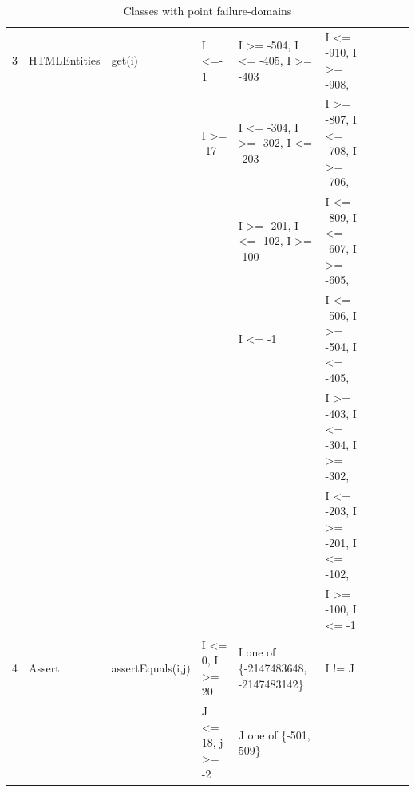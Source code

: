 \documentclass[runningheads,a4paper]{llncs}
\begin{document}
\begin{table}[h]
{{\begin{tabular}{|l|l|l|l|l|l|l|l|l|l|}
	
3	& HTMLEntities	& get(i)					&  	I \textless=- 1						& I \textgreater= -504, I \textless= -405, I \textgreater= -403		&  I \textless= -910, I \textgreater= -908,    									\\ 
	&                         &                                      & 	I \textgreater= -17					& I \textless= -304, I \textgreater= -302, I \textless= -203			&  I \textgreater= -807, I \textless= -708, I \textgreater= -706,  				 \\	
	&                         &                                      & 										& I \textgreater= -201, I \textless= -102, I \textgreater= -100		&  I \textless= -809, I \textless= -607, I \textgreater= -605,					 \\	
	&                         &                                      & 										& I \textless= -1													&  I \textless= -506, I \textgreater= -504, I \textless= -405,					 \\	
	&                         &                                      & 										& 																&  I \textgreater= -403, I \textless= -304, I \textgreater= -302,					 \\	
	&                         &                                      & 										& 																&  I \textless= -203, I \textgreater= -201, I \textless= -102,					  \\	
	&                         &                                      & 										& 																&  I \textgreater= -100, I \textless= -1			   		  					  \\	
4	& Assert			& assertEquals(i,j)		&	I \textless= 0, I \textgreater= 20		& I one of \{-2147483648, -2147483142\}	 						&  I != J																		  \\
	&                         &                                      & 	J \textless= 18, j \textgreater= -2		& J one of \{-501, 509\}											&  			   																  \\

\hline
\end{tabular}
}
}
\bigskip
\caption{Classes with point failure-domains}
\label{table:pointDomains}
\end{table}
\end{document}
